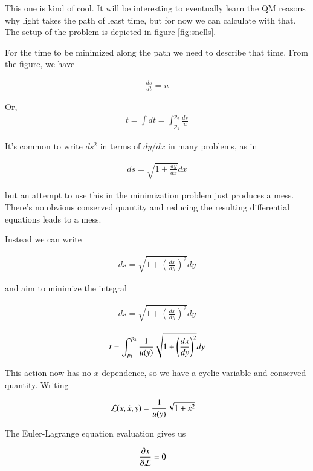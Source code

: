 \documentclass{article}
\begin{document}
This one is kind of cool.  It will be interesting to eventually learn the QM reasons why light takes the path of least time, but for now we can calculate with that.  The setup of the problem is depicted in figure \ref{fig:snells}.

For the time to be minimized along the path we need to describe that time.  From the figure, we have

\begin{align*}
\frac{ds}{dt} = u
\end{align*}

Or, 
\begin{align*}
t = \int dt = \int_{p_1}^{p_2} \frac{ds}{u}
\end{align*}

It's common to write $ds^2$ in terms of $dy/dx$ in many problems, as in 

\begin{align*}
ds = \sqrt{1 + \frac{dy}{dx}} dx
\end{align*}

but an attempt to use this in the minimization problem just produces a mess.   There's no obvious conserved quantity and reducing the resulting differential equations
leads to a mess.

Instead we can write

\begin{align*}
ds = \sqrt{1 + \left(\frac{dx}{dy}\right)^2} dy
\end{align*}

and aim to minimize the integral

\begin{align*}
ds = \sqrt{1 + \left(\frac{dx}{dy}\right)^2} dy
\end{align*}

\begin{align*}
t = \int_{p_1}^{p_2} \frac{1}{u(y)} \sqrt{1 + \left(\frac{dx}{dy}\right)^2} dy
\end{align*}

This action now has no $x$ dependence, so we have a cyclic variable and conserved quantity.  Writing

\begin{align*}
\mathcal{L}(x,\dot{x}, y) &= \frac{1}{u(y)} \sqrt{1 + \dot{x}^2} 
\end{align*}

The Euler-Lagrange equation evaluation gives us

\begin{align*}
\frac{\partial{x}}{\partial {\mathcal{L}}} &= 0
\end{align*}
\end{document}
